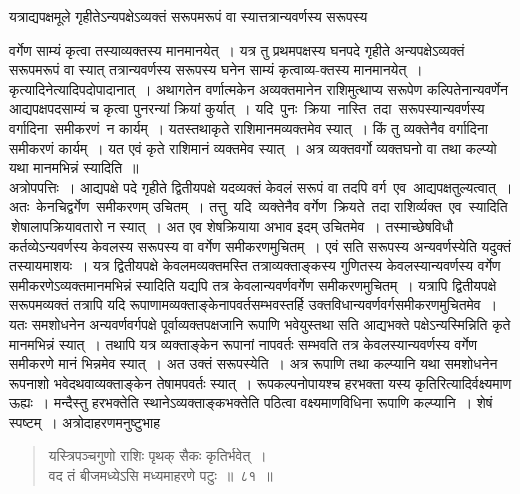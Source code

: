 \documentclass[11pt, openany]{book}
\begin{document}
\noindent यत्राद्यपक्षमूले गृहीतेऽन्यपक्षेऽव्यक्तं सरूपमरूपं वा
स्यात्तत्रान्यवर्णस्य सरूपस्य
\newpage

\noindent वर्गेण साम्यं कृत्वा तस्याव्यक्तस्य मानमानयेत्~। यत्र तु प्रथमपक्षस्य 
घनपदे गृहीते अन्यपक्षेऽव्यक्तं सरूपमरूपं वा स्यात् तत्रान्यवर्णस्य सरूपस्य 
घनेन साम्यं कृत्वाव्य-क्तस्य मानमानयेत्~। कृत्यादिनेत्यादिपदोपादानात्~। 
अथागतेन वर्णात्मकेन अव्यक्तमानेन राशिमुत्थाप्य सरूपेण कल्पितेनान्यवर्णेन आद्यपक्षपदसाम्यं च कृत्वा पुनरन्यां क्रियां कुर्यात्~। यदि \,पुनः \,क्रिया \,नास्ति \,तदा \,सरूपस्यान्यवर्णस्य \,वर्गादिना \,समीकरणं \,न कार्यम्~। 
यतस्तथाकृते राशिमानमव्यक्तमेव स्यात्~। किं तु व्यक्तेनैव वर्गादिना 
समीकरणं कार्यम्~। यत एवं कृते राशिमानं व्यक्तमेव स्यात्~। अत्र 
व्यक्तवर्गो व्यक्तघनो वा तथा कल्प्यो यथा मानमभिन्नं स्यादिति~॥ \\

\vspace{-3mm}
 अत्रोपपत्तिः~। आद्यपक्षे पदे गृहीते द्वितीयपक्षे यदव्यक्तं केवलं सरूपं 
वा तदपि वर्ग \,एव \,आद्यपक्षतुल्यत्वात्~। अतः \,केनचिद्वर्गेण \,समीकरणम् उचितम्~। तत्तु \,यदि \,व्यक्तेनैव वर्गेण \,क्रियते \,तदा राशिर्व्यक्त \,एव \,स्यादिति \,शेषालापक्रियावतारो न स्यात्~। अत एव शेषक्रियाया अभाव इदम् उचितमेव~। तस्माच्छेषविधौ कर्तव्येऽन्यवर्णस्य केवलस्य सरूपस्य वा वर्गेण 
समीकरणमुचितम्~। एवं सति सरूपस्य अन्यवर्णस्येति यदुक्तं तस्यायमाशयः~।
यत्र द्वितीयपक्षे केवलमव्यक्तमस्ति तत्राव्यक्ताङ्कस्य गुणितस्य
केवलस्यान्यवर्णस्य वर्गेण समीकरणेऽव्यक्तमानमभिन्नं स्यादिति यद्यपि तत्र केवलान्यवर्णवर्गेण समीकरणमुचितम्~। यत्रापि द्वितीयपक्षे सरूपमव्यक्तं तत्रापि यदि 
रूपाणामव्यक्ताङ्केनापवर्तसम्भवस्तर्हि उक्तविधान्यवर्णवर्गसमीकरणमुचितमेव~। यतः 
समशोधनेन अन्यवर्णवर्गपक्षे पूर्वाव्यक्तपक्षजानि रूपाणि भवेयुस्तथा सति 
आद्यभक्ते पक्षेऽन्यस्मिन्निति कृते मानमभिन्नं स्यात्~। तथापि यत्र व्यक्ताङ्केन 
रूपानां नापवर्तः सम्भवति तत्र केवलस्यान्यवर्णस्य वर्गेण समीकरणे मानं 
भिन्नमेव स्यात्~। अत उक्तं सरूपस्येति~। अत्र रूपाणि तथा कल्प्यानि 
यथा समशोधनेन रूपनाशो भवेदथवाव्यक्ताङ्केन तेषामपवर्तः स्यात्~। 
रूपकल्पनोपायश्च हरभक्ता यस्य कृतिरित्यादिर्वक्ष्यमाण ऊह्यः~। मन्दैस्तु
\newpage
\noindent हरभक्तेति स्थानेऽव्यक्ताङ्कभक्तेति पठित्वा वक्ष्यमाणविधिना रूपाणि
कल्प्यानि~। शेषं स्पष्टम्~। अत्रोदाहरणमनुष्टुभाह\textendash
\begin{quote}
    \ex
      यस्त्रिपञ्चगुणो राशिः पृथक् सैकः कृतिर्भवेत्~। \\
 वद तं बीजमध्येऽसि मध्यमाहरणे पटुः~॥~८१~॥~

\end{quote}
\end{document}
